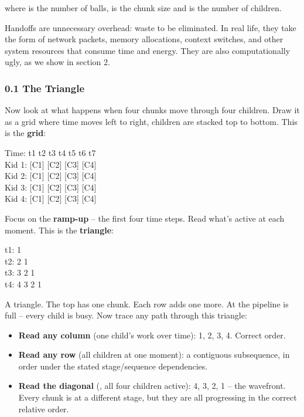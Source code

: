 \documentclass[
]{article}
\providecommand{\tightlist}{%
  \setlength{\itemsep}{0pt}\setlength{\parskip}{0pt}}
\begin{document}
where is the number of balls, is the chunk size and is the number of
children.

Handoffs are unnecessary overhead: waste to be eliminated. In real life,
they take the form of network packets, memory allocations, context
switches, and other system resources that consume time and energy. They
are also computationally ugly, as we show in section 2.

\subsubsection{\texorpdfstring{\textbf{0.1 The
Triangle}}{0.1 The Triangle}}\label{the-triangle}

Now look at what happens when four chunks move through four children.
Draw it as a grid where time moves left to right, children are stacked
top to bottom. This is the \textbf{grid}:

Time: t1 t2 t3 t4 t5 t6 t7\\
Kid 1: {[}C1{]} {[}C2{]} {[}C3{]} {[}C4{]}\\
Kid 2: {[}C1{]} {[}C2{]} {[}C3{]} {[}C4{]}\\
Kid 3: {[}C1{]} {[}C2{]} {[}C3{]} {[}C4{]}\\
Kid 4: {[}C1{]} {[}C2{]} {[}C3{]} {[}C4{]}

Focus on the \textbf{ramp-up} -- the first four time steps. Read what's
active at each moment. This is the \textbf{triangle}:

t1: 1\\
t2: 2 1\\
t3: 3 2 1\\
t4: 4 3 2 1

A triangle. The top has one chunk. Each row adds one more. At the
pipeline is full -- every child is busy. Now trace any path through this
triangle:

\begin{itemize}
\tightlist
\item
  \textbf{Read any column} (one child's work over time): 1, 2, 3, 4.
  Correct order.\\
\item
  \textbf{Read any row} (all children at one moment): a contiguous
  subsequence, in order under the stated stage/sequence dependencies.\\
\item
  \textbf{Read the diagonal} (, all four children active): 4, 3, 2, 1 --
  the wavefront. Every chunk is at a different stage, but they are all
  progressing in the correct relative order.
\end{itemize}
\end{document}
